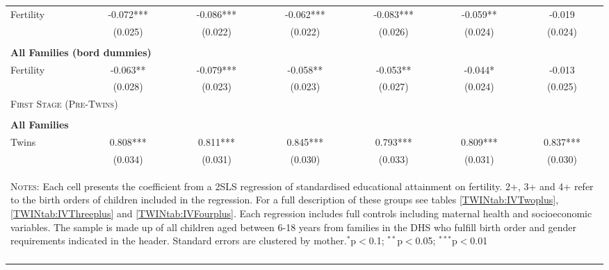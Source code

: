 \begin{table}[!htbp]
\begin{tabular}{lcccccc}
Fertility&-0.072***&-0.086***&-0.062***&-0.083***&-0.059**&-0.019\\
         &(0.025)&(0.022)&(0.022)&(0.026)&(0.024)&(0.024)\\
&&&&\\
\multicolumn{7}{l}{\textbf{All Families (bord dummies)}}\\ 
Fertility&-0.063**&-0.079***&-0.058**&-0.053**&-0.044*&-0.013\\
         &(0.028)&(0.023)&(0.023)&(0.027)&(0.024)&(0.025)\\
\midrule\multicolumn{7}{l}{\textsc{First Stage (Pre-Twins)}}\\ 
&&&&\\
\multicolumn{7}{l}{\textbf{All Families}}\\ 
Twins&0.808***&0.811***&0.845***&0.793***&0.809***&0.837***\\
         &(0.034)&(0.031)&(0.030)&(0.033)&(0.031)&(0.030)\\

\midrule\multicolumn{7}{p{13.4cm}}{\begin{footnotesize}\textsc{Notes:} Each cell presents the coefficient from a 2SLS regression of standardised educational attainment on fertility.  2+, 3+ and 4+ refer to the birth orders of children included in the regression.  For a full description of these groups see tables \ref{TWINtab:IVTwoplus}, \ref{TWINtab:IVThreeplus} and \ref{TWINtab:IVFourplus}.  Each regression includes full controls including maternal health and socioeconomic variables.  The sample is made up of all children aged between 6-18 years from families in the DHS who fulfill birth order and gender requirements indicated in the header.  Standard errors are clustered by mother.$^{*}$p$<$0.1; $^{**}$p$<$0.05; $^{***}$p$<$0.01 
\end{footnotesize}}
\\\bottomrule\normalsize\end{tabular}\end{table} 
